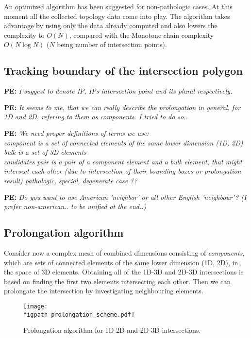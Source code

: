 \documentclass{elsarticle}
\newcommand{\figpath}{figures/}
\newcommand{\notePE}[1]{{\color{Orange} \textbf{PE: } \textit{#1}}}
\begin{document}
An optimized algorithm has been suggested for non-pathologic cases. At this moment all the collected topology 
data come into play. The algorithm takes advantage by using only the data already computed and also lowers
the complexity to $O(N)$, compared with the Monotone chain complexity $O(N\log N)$ 
($N$ being number of intersection points).


\subsection{Tracking boundary of the intersection polygon}
\notePE{I suggest to denote IP, IPs intersection point and its plural respectively.}

\notePE{It seems to me, that we can really describe the prolongation in general, for 1D and 2D, 
refering to them as components. I tried to do so..}

\notePE{We need proper definitions of terms we use: \\
\emph{component} is a set of connected elements of the same lower dimension (1D, 2D)\\
\emph{bulk} is a set of 3D elements\\
\emph{candidates pair}  is a pair of a component element and a bulk element, that might intersect
each other (due to intersection of their bounding boxes or prolongation result)
\emph{pathologic, special, degenerate case ??}
}

\notePE{Do you want to use American 'neighbor' or all other English 'neighbour'? (I prefer non-american.. to be unified at the end..)}

\subsection{Prolongation algorithm}
Consider now a complex mesh of combined dimensions consisting of \emph{components}, which are sets of connected
elements of the same lower dimension (1D, 2D), in the space of 3D elements. 
Obtaining all of the 1D-3D and 2D-3D intersections is based on finding the first two elements intersecting each other.
Then we can prolongate the intersection by investigating neighbouring elements.
%
\begin{figure}[!htb]
  \centering    
    \texttt{[image: \\figpath prolongation\_scheme.pdf]}
  \caption{Prolongation algorithm for 1D-2D and 2D-3D intersections. }
  \label{fig:prolongation}
\end{figure}
\end{document}
